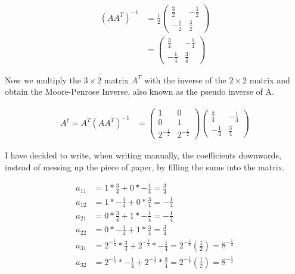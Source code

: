 \documentclass[a4paper]{article}
\begin{document}
\begin{PropositionOpt4}
\begin{displaymath}
\begin{align}
	(AA^T)^{-1} &= \frac12\begin{pmatrix}\frac32 & -\frac12 \\ -\frac12 & \frac32 \end{pmatrix}\\
	&= \begin{pmatrix}\frac34 & -\frac14 \\ -\frac14 & \frac34 \end{pmatrix}
\end{align}
\end{displaymath}

Now we multiply the $3 \times 2$ matrix $A^T$ with the inverse of the $2 \times 2$ matrix and obtain the Moore-Penrose Inverse, also known as the pseudo inverse of A.

\begin{displaymath}
\begin{align}
	A^{\dagger} = A^T (AA^T)^{-1} &= \begin{pmatrix}
	1&0\\
	0&1\\
	2^{-\frac12}&
	2^{-\frac12}
	\end{pmatrix} \begin{pmatrix}\frac34 & -\frac14 \\ -\frac14 & \frac34 \end{pmatrix}
\end{align}
\end{displaymath}

I have decided to write, when writing manually, the coefficients downwards, instead of messing up the piece of paper, by filling the sums into the matrix.

\begin{displaymath}
\begin{align}
	a_11 &= 1* \frac34 + 0*-\frac14 = \frac34\\
	a_12 &= 1* -\frac14 + 0*\frac34 = -\frac14\\
	a_21 &= 0* \frac34 + 1*-\frac14 = -\frac14\\
	a_22 &= 0* -\frac14 + 1*\frac34 = \frac34\\	
	a_31 &=2^{-\frac12} * \frac34 + 2^{-\frac12}*-\frac14 = 2^{-\frac12}(\frac12) = 8^{-\frac12}\\
	a_32 &=2^{-\frac12} * -\frac14 + 2^{-\frac12}*\frac34 = 2^{-\frac12}(\frac12) = 8^{-\frac12}\\
\end{align}
\end{displaymath}


\end{PropositionOpt4}
\end{document}
